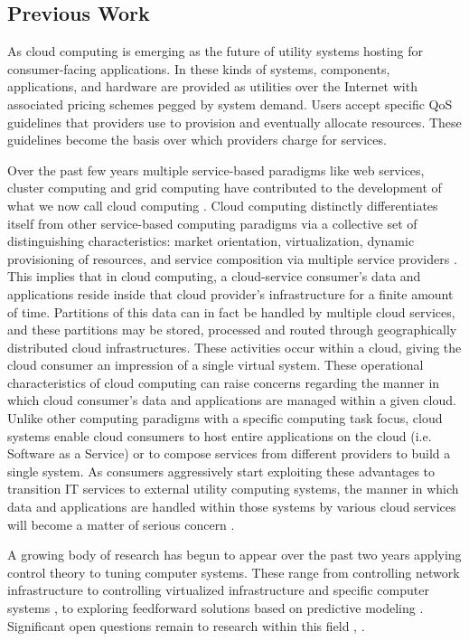 \subsection{Previous Work}
As cloud computing is emerging as the future of utility systems hosting for consumer-facing applications.  In these kinds of systems, components, applications, and hardware are provided as utilities over the Internet with associated pricing schemes pegged by system demand.  Users accept specific QoS guidelines that providers use to provision and eventually allocate resources. These guidelines become the basis over which providers charge for services.

Over the past few years multiple service-based paradigms like web services, cluster computing and grid computing have contributed to the development of what we now call cloud computing \cite{Bu:09}. Cloud computing distinctly differentiates itself from other service-based computing paradigms via a collective set of distinguishing characteristics:  market orientation, virtualization, dynamic provisioning of resources, and service composition via multiple service providers \cite{BuYeVeBrBr:09}. This implies that in cloud computing, a cloud-service consumer's data and applications reside inside that cloud provider's infrastructure for a finite amount of time.  Partitions of this data can in fact be handled by multiple cloud services, and these partitions may be stored, processed and routed through geographically distributed cloud infrastructures. These activities occur within a cloud, giving the cloud consumer an impression of a single virtual system.  These operational characteristics of cloud computing can raise concerns regarding the manner in which cloud consumer's data and applications are managed within a given cloud. Unlike other computing paradigms with a specific computing task focus, cloud systems enable cloud consumers to host entire applications on the cloud (i.e. Software as a Service) or to compose services from different providers to build a single system. As consumers aggressively start exploiting these advantages to transition IT services to external utility computing systems, the manner in which data and applications are handled within those systems by various cloud services will become a matter of serious concern \cite{Jamkhedkar:2010:IUM:1866870.1866885}.

A growing body of research has begun to appear over the past two years applying control theory to tuning computer systems.  These range from controlling network infrastructure \cite{ctrl:ariba-GL:2009} to controlling virtualized infrastructure and specific computer systems \cite{ctrl:wang-cgswrzh:2009}, \cite{ctrl:kjaer-kr:2009} to exploring feedforward solutions based on predictive modeling \cite{ctrl:abdelwahed-bsk:2009}.  Significant open questions remain to research within this field \cite{ctrl:Zhu:2009:CTB:1496909.1496922}, \cite{ctrl:hellerstein-sw:2009}.